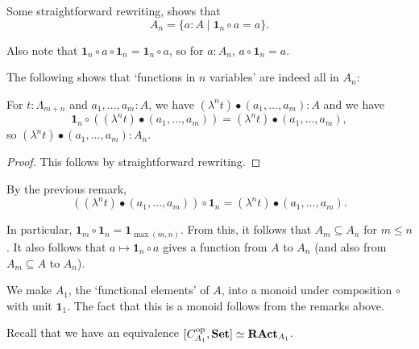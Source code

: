\begin{remark}
  Some straightforward rewriting, shows that
  \[ A_n = \{ a : A \mid \mathbf 1_n \circ a = a \}. \]
\end{remark}

\begin{remark}
  Also note that $ \mathbf 1_n \circ a \circ \mathbf 1_n = \mathbf 1_n \circ a $, so for $ a : A_n $, $ a \circ \mathbf 1_n = a $.
\end{remark}

The following shows that `functions in $ n $ variables' are indeed all in $ A_n $:
\begin{lemma}
  For $ t: \Lambda_{m + n} $ and $ a_1, \dots, a_m: A $, we have $ (\lambda^n t) \bullet (a_1, \dots, a_m) : A $ and we have
  \[ \mathbf 1_n \circ ((\lambda^n t) \bullet (a_1, \dots, a_m)) = (\lambda^n t) \bullet (a_1, \dots, a_m), \]
  so $ (\lambda^n t) \bullet (a_1, \dots, a_m) : A_n $.
\end{lemma}
\begin{proof}
  This follows by straightforward rewriting.
\end{proof}

\begin{corollary}
  By the previous remark,
  \[ ((\lambda^n t) \bullet (a_1, \dots, a_m)) \circ \mathbf 1_n = (\lambda^n t) \bullet (a_1, \dots, a_m). \]
\end{corollary}
\begin{corollary}
  In particular, $ \mathbf 1_m \circ \mathbf 1_n = \mathbf 1_{\max(m, n)} $. From this, it follows that $ A_m \subseteq A_n $ for $ m \leq n $. It also follows that $ a \mapsto \mathbf 1_n \circ a $ gives a function from $ A $ to $ A_n $ (and also from $ A_m \subseteq A $ to $ A_n $).
\end{corollary}

\begin{definition}
  We make $ A_1 $, the `functional elements' of $ A $, into a monoid under composition $ \circ $ with unit $ \mathbf 1_1 $. The fact that this is a monoid follows from the remarks above.
\end{definition}

Recall that we have an equivalence $ [C_{A_1}^{\text{op}}, \mathbf{Set}] \simeq \mathbf{RAct}_{A_1} $.

